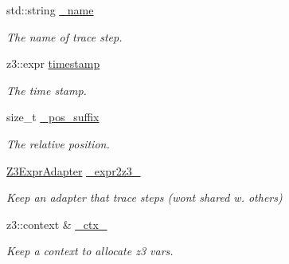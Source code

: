 \begin{DoxyCompactItemize}
\mbox{\label{classilang_1_1_trace_step_a9d6acc91fb2dc05d869cc03a6d5da2a5}} 
std\+::string \mbox{\hyperlink{classilang_1_1_trace_step_a9d6acc91fb2dc05d869cc03a6d5da2a5}{\+\_\+name}}
\begin{DoxyCompactList}\small\item\em The name of trace step. \end{DoxyCompactList}\item 
\mbox{\label{classilang_1_1_trace_step_aa0b1ef939a7e401bec4e5bbbaa51c87b}} 
z3\+::expr \mbox{\hyperlink{classilang_1_1_trace_step_aa0b1ef939a7e401bec4e5bbbaa51c87b}{timestamp}}
\begin{DoxyCompactList}\small\item\em The time stamp. \end{DoxyCompactList}\item 
\mbox{\label{classilang_1_1_trace_step_a5e83d5e4025da3af5a368f1ede165e82}} 
size\+\_\+t \mbox{\hyperlink{classilang_1_1_trace_step_a5e83d5e4025da3af5a368f1ede165e82}{\+\_\+pos\+\_\+suffix}}
\begin{DoxyCompactList}\small\item\em The relative position. \end{DoxyCompactList}\item 
\mbox{\label{classilang_1_1_trace_step_a6661768f54a30c7dbe932d5670beaf1a}} 
\mbox{\hyperlink{classilang_1_1_z3_expr_adapter}{Z3\+Expr\+Adapter}} \mbox{\hyperlink{classilang_1_1_trace_step_a6661768f54a30c7dbe932d5670beaf1a}{\+\_\+expr2z3\+\_\+}}
\begin{DoxyCompactList}\small\item\em Keep an adapter that trace steps (won\textquotesingle{}t shared w. others) \end{DoxyCompactList}\item 
\mbox{\label{classilang_1_1_trace_step_aed56f1b6b03968217ad5c7406a99a536}} 
z3\+::context \& \mbox{\hyperlink{classilang_1_1_trace_step_aed56f1b6b03968217ad5c7406a99a536}{\+\_\+ctx\+\_\+}}
\begin{DoxyCompactList}\small\item\em Keep a context to allocate z3 vars. \end{DoxyCompactList}\item 

\end{DoxyCompactItemize}
